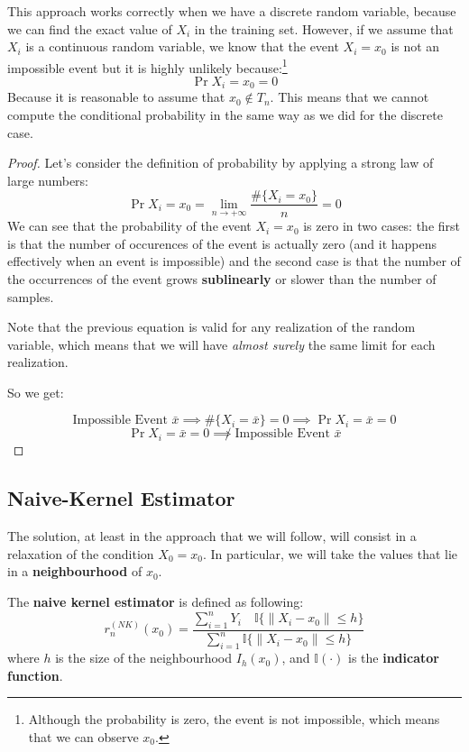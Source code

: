 This approach works correctly when we have a discrete random variable, because we can find the exact value of $X_i$ in the training set. However, if we assume that $X_i$ is a continuous random variable, we know that the event $X_i = x_0$ is not an impossible event but it is highly unlikely because:\footnote{Although the probability is zero, the event is not impossible, which means that we can observe $x_0$.}
\[
    \Pr{X_i = x_0} = 0
\]
Because it is reasonable to assume that $x_0 \notin T_n$. This means that we cannot compute the conditional probability in the same way as we did for the discrete case.

\begin{proof}
    Let's consider the definition of probability by applying a strong law of large numbers:
    \[
        \Pr{X_i = x_0} = \lim_{n \to +\infty} \frac{\#\{X_i = x_0\}}{n} = 0
    \]
    We can see that the probability of the event $X_i = x_0$ is zero in two cases: the first is that the number of occurences of the event is actually zero (and it happens effectively when an event is impossible) and the second case is that the number of the occurrences of the event grows \textbf{sublinearly} or slower than the number of samples.

    Note that the previous equation is valid for any realization of the random variable, which means that we will have \textit{almost surely} the same limit for each realization.

    So we get:

    \[
        \text{Impossible Event } \bar x \implies \#\{X_i=\bar x\} = 0\implies \Pr{X_i = \bar x} = 0     
    \]
    \[
        \Pr{X_i = \bar x} = 0 \not\implies \text{Impossible Event }\bar x
    \]
\end{proof}
\subsection{Naive-Kernel Estimator}
The solution, at least in the approach that we will follow, will consist in a relaxation of the condition $X_0 = x_0$. In particular, we will take the values that lie in a \textbf{neighbourhood} of $x_0$.
\begin{definition}
    The \textbf{naive kernel estimator} is defined as following:
    \[
        r_n^{(NK)}(x_0) = \frac{\sum_{i=1}^n Y_i \quad \mathbb{I}\{\lVert X_i - x_0 \rVert \leq h\} }{\sum_{i=1}^n \mathbb{I}\{\lVert X_i - x_0 \rVert \leq h\}}
    \]
    where $h$ is the size of the neighbourhood $I_h(x_0)$, and $\mathbb{I}(\cdot)$ is the \textbf{indicator function}.
\end{definition}

